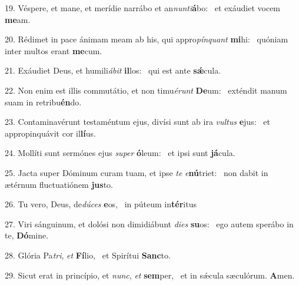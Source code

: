 19. Véspere, et mane, et merídie narrábo et an\textit{nun}\textit{ti}\textbf{á}bo: \ast\  et exáudiet vocem \textbf{me}am.\

20. Rédimet in pace ánimam meam ab his, qui appro\textit{pín}\textit{quant} \textbf{mi}hi: \ast\  quóniam inter multos erant \textbf{me}cum.\

21. Exáudiet Deus, et humili\textit{á}\textit{bit} \textbf{il}los: \ast\  qui est ante \textbf{sǽ}cula.\

22. Non enim est illis commutátio, et non timu\textit{é}\textit{runt} \textbf{De}um: \ast\  exténdit manum suam in retribu\textbf{én}do.\

23. Contaminavérunt testaméntum ejus, divísi sunt ab ira \textit{vul}\textit{tus} \textbf{e}jus: \ast\  et appropinquávit cor il\textbf{lí}us.\

24. Mollíti sunt sermónes ejus \textit{su}\textit{per} \textbf{ó}leum: \ast\  et ipsi sunt \textbf{já}cula.\

25. Jacta super Dóminum curam tuam, et ipse \textit{te} \textit{e}\textbf{nú}triet: \ast\  non dabit in ætérnum fluctuatiónem \textbf{jus}to.\

26. Tu vero, Deus, de\textit{dú}\textit{ces} \textbf{e}os, \ast\  in púteum in\textbf{tér}itus\

27. Viri sánguinum, et dolósi non dimidiábunt \textit{di}\textit{es} \textbf{su}os: \ast\  ego autem sperábo in te, \textbf{Dó}mine.\

28. Glória Pa\textit{tri}, \textit{et} \textbf{Fí}lio, \ast\  et Spirítui \textbf{Sanc}to.\

29. Sicut erat in princípio, et \textit{nunc}, \textit{et} \textbf{sem}per, \ast\  et in sǽcula sæculórum. \textbf{A}men.\

